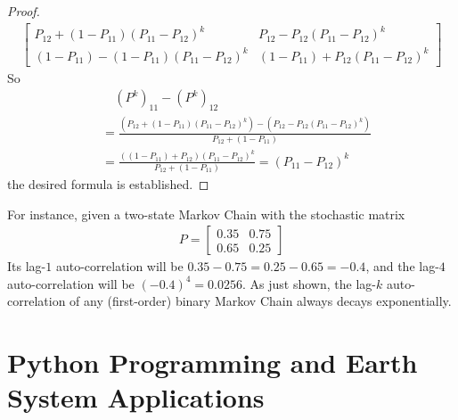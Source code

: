 \begin{proof}
\begin{align*}
\begin{bmatrix}
P_{12} + (1-P_{11})(P_{11}-P_{12})^k & P_{12} - P_{12}(P_{11}-P_{12})^k \\
(1-P_{11}) - (1-P_{11})(P_{11}-P_{12})^k & (1-P_{11}) + P_{12}(P_{11}-P_{12})^k
\end{bmatrix}
\end{align*}
So
\begin{align*}
&\quad (P^k)_{11} - (P^k)_{12} \\
&= \frac{(P_{12} + (1-P_{11})(P_{11}-P_{12})^k) - (P_{12} - P_{12}(P_{11}-P_{12})^k)}{P_{12} + (1 - P_{11})}\\
&= \frac{((1-P_{11}) + P_{12})(P_{11}-P_{12})^k}{P_{12} + (1 - P_{11})} = (P_{11} - P_{12})^k    
\end{align*}
the desired formula is established.
\end{proof}

For instance, given a two-state Markov Chain with the stochastic matrix
\begin{align*}
P = 
\begin{bmatrix}
0.35 & 0.75 \\
0.65 & 0.25
\end{bmatrix}
\end{align*}
Its lag-$1$ auto-correlation will be $0.35 - 0.75 = 0.25 - 0.65 = -0.4$, and the lag-$4$ auto-correlation will be $(-0.4)^4 = 0.0256$. As just shown, the lag-$k$ auto-correlation of any (first-order) binary Markov Chain always decays exponentially.

\section{Python Programming and Earth System Applications}

